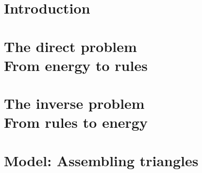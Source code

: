 \documentclass[phd,lfcs]{infthesis}
\begin{document}
\chapter{Introduction}
\label{chp:intro}


\chapter[The direct problem: From energy to rules]{
  The direct problem \\
  \LARGE From energy to rules}
\label{chp:direct}


\chapter[The inverse problem: From rules to energy]{
  The inverse problem \\
  \LARGE From rules to energy}
\label{chp:inverse}
% 

\appendix
\chapter{Model: Assembling triangles}
\label{app:triangles}

\fi

% 

\singlespace

% 

\printbibliography

\end{document}
